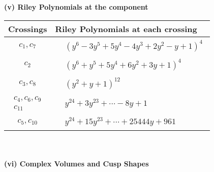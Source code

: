 \documentclass[1p]{elsarticle_modified}
\theoremstyle{definition}
\begin{document}
\newpage\renewcommand{\arraystretch}{1}
\flushleft \textbf{(v) Riley Polynomials at the component}\newline \\
\begin{tabular}{m{50pt}|m{274pt}}
Crossings & \hspace{64pt}Riley Polynomials at each crossing \\
\hline $$\begin{aligned}c_{1},c_{7}\end{aligned}$$&$\begin{aligned}
&(y^6-3 y^5+5 y^4-4 y^3+2 y^2- y+1)^4
\end{aligned}$\\
\hline $$\begin{aligned}c_{2}\end{aligned}$$&$\begin{aligned}
&(y^6+y^5+5 y^4+6 y^2+3 y+1)^4
\end{aligned}$\\
\hline $$\begin{aligned}c_{3},c_{8}\end{aligned}$$&$\begin{aligned}
&(y^2+y+1)^{12}
\end{aligned}$\\
\hline $$\begin{aligned}c_{4},c_{6},c_{9}\\c_{11}\end{aligned}$$&$\begin{aligned}
&y^{24}+3 y^{23}+\cdots-8 y+1
\end{aligned}$\\
\hline $$\begin{aligned}c_{5},c_{10}\end{aligned}$$&$\begin{aligned}
&y^{24}+15 y^{23}+\cdots+25444 y+961
\end{aligned}$\\
\hline
\end{tabular}\\~\\
\newpage\flushleft \textbf{(vi) Complex Volumes and Cusp Shapes}
\end{document}
